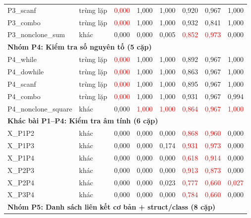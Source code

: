\documentclass[11pt,a4paper]{article}
\begin{document}
{\begin{longtable}{llcccccc}
P3\_scanf              & trùng lặp  & \textcolor{red}{0,000} & 1,000 & 1,000 & 0,920 & 0,967 & 1,000 \\
P3\_combo              & trùng lặp  & \textcolor{red}{0,000} & 1,000 & 1,000 & 0,932 & 0,841 & 1,000 \\
P3\_nonclone\_sum      & khác       & 0,000 & 0,000 & 0,005 & \textcolor{red}{0,852} & \textcolor{red}{0,973} & 0,000 \\
\midrule
\multicolumn{8}{l}{\textbf{Nhóm P4: Kiểm tra số nguyên tố (5 cặp)}} \\
\midrule
P4\_while              & trùng lặp  & \textcolor{red}{0,000} & 1,000 & 1,000 & 0,892 & 0,967 & 1,000 \\
P4\_dowhile            & trùng lặp  & \textcolor{red}{0,000} & 1,000 & 1,000 & 0,863 & 0,967 & 1,000 \\
P4\_scanf              & trùng lặp  & \textcolor{red}{0,000} & 1,000 & 1,000 & 0,895 & 0,967 & 1,000 \\
P4\_combo              & trùng lặp  & \textcolor{red}{0,000} & 1,000 & 1,000 & 0,931 & 0,967 & 0,994 \\
P4\_nonclone\_square   & khác       & 0,000 & \textcolor{red}{1,000} & \textcolor{red}{1,000} & \textcolor{red}{0,864} & \textcolor{red}{0,967} & \textcolor{red}{1,000} \\
\midrule
\multicolumn{8}{l}{\textbf{Khác bài P1--P4: Kiểm tra âm tính (6 cặp)}} \\
\midrule
X\_P1P2                & khác       & 0,000 & 0,000 & 0,000 & \textcolor{red}{0,868} & \textcolor{red}{0,960} & 0,000 \\
X\_P1P3                & khác       & 0,000 & 0,000 & 0,174 & \textcolor{red}{0,931} & \textcolor{red}{0,973} & 0,000 \\
X\_P1P4                & khác       & 0,000 & 0,000 & 0,000 & \textcolor{red}{0,618} & \textcolor{red}{0,914} & 0,000 \\
X\_P2P3                & khác       & 0,000 & 0,000 & 0,000 & \textcolor{red}{0,913} & \textcolor{red}{0,873} & 0,000 \\
X\_P2P4                & khác       & 0,000 & 0,000 & 0,023 & \textcolor{red}{0,777} & \textcolor{red}{0,660} & \textcolor{red}{0,027} \\
X\_P3P4                & khác       & 0,000 & 0,000 & 0,000 & \textcolor{red}{0,784} & \textcolor{red}{0,660} & 0,000 \\
\midrule
\multicolumn{8}{l}{\textbf{Nhóm P5: Danh sách liên kết cơ bản + struct/class (8 cặp)}} \\

\end{longtable}}
\end{document}
